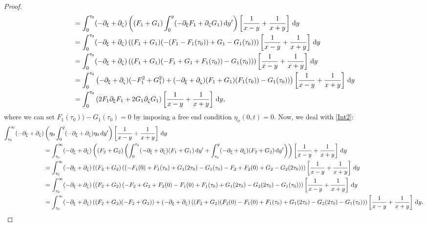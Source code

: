 \documentclass[10pt,reqno,oneside,a4paper, landscape]{article}
\begin{document}
\begin{proof}
\begin{align*}
&= \int_0^{\tau_0} (- \partial_\xi + \partial_\zeta)\left( (F_1 + G_1) \int^{y}_0 (-\partial_\xi F_1 + \partial_\zeta G_1) \,\mathrm{d} y' \right) \left[ \frac{1}{x-y} + \frac{1}{x+y} \right] \,\mathrm{d} y \\
&= \int_0^{\tau_0} (- \partial_\xi + \partial_\zeta)\left( (F_1 + G_1) (- (F_1-F_1(\tau_0)) + G_1 - G_1(\tau_0) )\right) \left[ \frac{1}{x-y} + \frac{1}{x+y} \right] \,\mathrm{d} y \\
&= \int_0^{\tau_0} (- \partial_\xi + \partial_\zeta)\left( (F_1 + G_1) ( - F_1 + G_1 + F_1(\tau_0) ) - G_1(\tau_0) )\right) \left[ \frac{1}{x-y} + \frac{1}{x+y} \right] \,\mathrm{d} y \\
&= \int_0^{\tau_0} \left(- \partial_\xi + \partial_\zeta) (-F_1^2 + G_1^2)  + (- \partial_\xi + \partial_\zeta)(F_1 + G_1) (F_1(\tau_0) ) - G_1(\tau_0) )\right) \left[ \frac{1}{x-y} + \frac{1}{x+y} \right] \,\mathrm{d} y \\
&= \int_0^{\tau_0} \left( 2 F_1  \partial_\xi F_1 + 2 G_1 \partial_\zeta G_1 \right) \left[ \frac{1}{x-y} + \frac{1}{x+y} \right] \,\mathrm{d} y, 
\end{align*}
where we can set $F_1(\tau_0) ) - G_1(\tau_0)  = 0$ by imposing a free end condition $\eta_x(0,t) = 0.$ Now, we deal with \eqref{Int2}:
\begin{align*}
\int_{\tau_0}^\infty (- \partial_\xi + \partial_\zeta)&\left( \eta_0 \int^{y}_0 (- \partial_\xi + \partial_\zeta)\eta_0 \D y' \right) \left[ \frac{1}{x-y} + \frac{1}{x+y} \right] \D y \\
&= \int_{\tau_0}^\infty  (- \partial_\xi + \partial_\zeta)\left( (F_2 + G_2) \left (\int^{\tau_0}_0 (- \partial_\xi + \partial_\zeta)(F_1 + G_1) \D y'  +  \int^{y}_{\tau_0} (- \partial_\xi + \partial_\zeta)(F_2 + G_2) \D y' \right) \right) \left[ \frac{1}{x-y} + \frac{1}{x+y} \right] \D y \\
&=  \int_{\tau_0}^\infty  (- \partial_\xi + \partial_\zeta)\left( (F_2 + G_2) \left( (- F_1(0) + F_1(\tau_0) + G_1(2\tau_0) - G_1(\tau_0)-  F_2 + F_2(0) + G_2 - G_2(2\tau_0) \right) \right) \left[ \frac{1}{x-y} + \frac{1}{x+y} \right] \D y \\
&=  \int_{\tau_0}^\infty  (- \partial_\xi + \partial_\zeta)\left( (F_2 + G_2) \left( - F_2 + G_2 + F_2(0) - F_1(0)  + F_1(\tau_0)  + G_1(2\tau_0) - G_2(2\tau_0) - G_1(\tau_0) \right) \right) \left[ \frac{1}{x-y} + \frac{1}{x+y} \right] \D y \\
&=  \int_{\tau_0}^\infty  (- \partial_\xi + \partial_\zeta)\left( (F_2 + G_2) (- F_2 + G_2) \right) +  (- \partial_\xi + \partial_\zeta)\left( (F_2 + G_2) (F_2(0) - F_1(0)  + F_1(\tau_0)  + G_1(2\tau_0) - G_2(2\tau_0) - G_1(\tau_0) ) \right) \left[ \frac{1}{x-y} + \frac{1}{x+y} \right] \D y.

\end{align*}
\end{proof}
\end{document}
